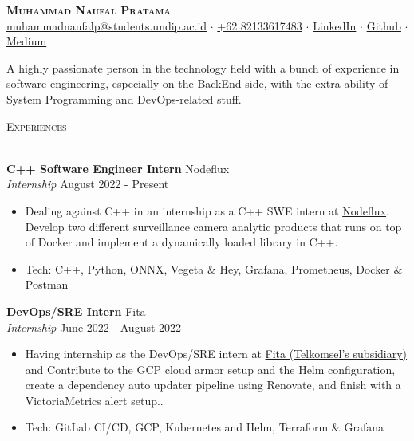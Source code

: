 \documentclass[a4paper]{article}
\newcommand{\lineunder} {
    \vspace*{-8pt} \\
    \hspace*{-18pt} \hrulefill \\
}
\newcommand{\header} [1] {
    {\hspace*{-18pt}\vspace*{6pt} \textsc{#1}}
    \vspace*{-6pt} \lineunder
}
\begin{document}
\vspace*{-40pt}

\vspace*{-10pt}
\begin{center}
	{\Huge \scshape \textbf{Muhammad Naufal Pratama}}\\
	\href{mailto:muhammadnaufalp@students.undip.ac.id}{muhammadnaufalp@students.undip.ac.id} $\cdot$ \href{https://wa.me/6282133617483}{+62 82133617483} $\cdot$ \href{https://linkedin.com/in/mnpratamaa}{LinkedIn} $\cdot$ \href{https://github.com/mhnaufal}{Github} $\cdot$ \href{https://medium.com/@mprtmma}{Medium}\\
\end{center}

A highly passionate person in the technology field with a bunch of experience in software engineering, especially on the BackEnd side, with the extra ability of System Programming and DevOps-related stuff.\\
\hfill \break

\header{Experiences}
\vspace{1mm}

\textbf{C++ Software Engineer Intern} \hfill Nodeflux\\
\textit{Internship} \hfill August 2022 - Present\\
\vspace{-1mm}
\begin{itemize} \itemsep 1pt
	\item Dealing against C++ in an internship as a C++ SWE intern at \href{https://www.nodeflux.io/}{Nodeflux}. Develop two different surveillance camera analytic products that runs on top of Docker and implement a dynamically loaded library in C++.
	\item Tech: C++, Python, ONNX, Vegeta \& Hey, Grafana, Prometheus, Docker \& Postman
\end{itemize}

\textbf{DevOps/SRE Intern} \hfill Fita\\
\textit{Internship} \hfill June 2022 - August 2022\\
\vspace{-1mm}
\begin{itemize} \itemsep 1pt
	\item Having internship as the DevOps/SRE intern at \href{https://fita.co.id/}{Fita (Telkomsel's subsidiary)} and Contribute to the GCP cloud armor setup and the Helm configuration, create a dependency auto updater pipeline using Renovate, and finish with a VictoriaMetrics alert setup..
	\item Tech: GitLab CI/CD, GCP, Kubernetes and Helm, Terraform \& Grafana
\end{itemize}
\end{document}
